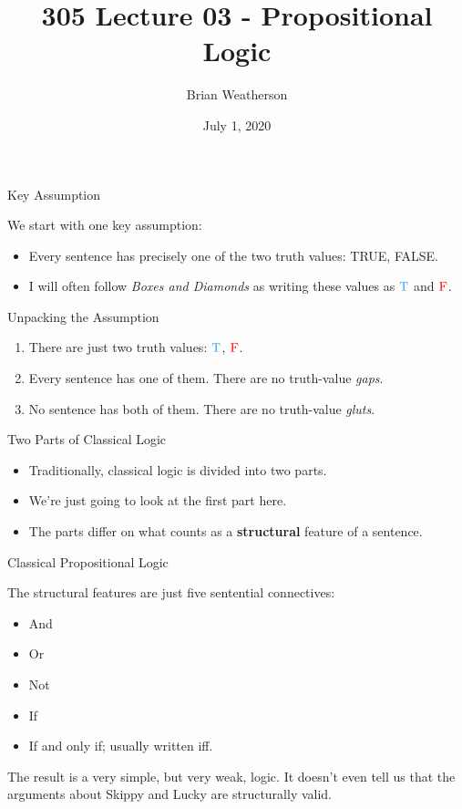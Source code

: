 \documentclass[
  ignorenonframetext,
]{beamer}
\title{305 Lecture 03 - Propositional Logic}
\author{Brian Weatherson}
\date{July 1, 2020}
\providecommand{\tightlist}{%
  \setlength{\itemsep}{0pt}\setlength{\parskip}{0pt}}
\renewcommand{\,}{\text{, }}
\def\True{\textcolor{dodgerblue}{\text{T}}}
\def\False{\textcolor{red}{\text{F}}}
\begin{document}
\frame{\titlepage}

\begin{frame}{Key Assumption}
\protect\hypertarget{key-assumption}{}

We start with one key assumption:

\begin{itemize}
\tightlist
\item
  Every sentence has precisely one of the two truth values: TRUE, FALSE.
\item
  I will often follow \emph{Boxes and Diamonds} as writing these values
  as \(\True\) and \(\False\).
\end{itemize}

\end{frame}

\begin{frame}{Unpacking the Assumption}
\protect\hypertarget{unpacking-the-assumption}{}

\begin{enumerate}
\tightlist
\item
  There are just two truth values: \(\True\), \(\False\).\\
\item
  Every sentence has one of them. There are no truth-value \emph{gaps}.
\item
  No sentence has both of them. There are no truth-value \emph{gluts}.
\end{enumerate}

\end{frame}

\begin{frame}{Two Parts of Classical Logic}
\protect\hypertarget{two-parts-of-classical-logic}{}

\begin{itemize}
\tightlist
\item
  Traditionally, classical logic is divided into two parts.
\item
  We're just going to look at the first part here.
\item
  The parts differ on what counts as a \textbf{structural} feature of a
  sentence.
\end{itemize}

\end{frame}

\begin{frame}{Classical Propositional Logic}
\protect\hypertarget{classical-propositional-logic}{}

The structural features are just five sentential connectives:

\begin{itemize}
\tightlist
\item
  And
\item
  Or
\item
  Not
\item
  If
\item
  If and only if; usually written iff.
\end{itemize}

The result is a very simple, but very weak, logic. It doesn't even tell
us that the arguments about Skippy and Lucky are structurally valid.

\end{frame}
\end{document}
